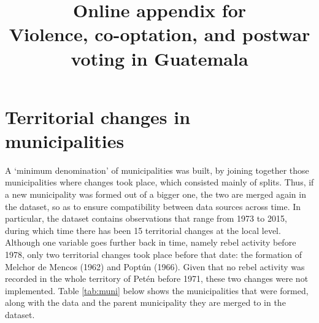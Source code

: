\documentclass[a4paper, 12pt, notitlepage]{article}
\title{\Large Online appendix for\\Violence, co-optation, and postwar voting in Guatemala}
\author{}%
\date{}
\begin{document}
\maketitle

\tableofcontents


\clearpage
\section{Territorial changes in municipalities}\label{app:muni}

A `minimum denomination' of municipalities was built, by joining together those municipalities where changes took place, which consisted mainly of splits.
Thus, if a new municipality was formed out of a bigger one, the two are merged again in the dataset, so as to ensure compatibility between data sources across time.
In particular, the dataset contains observations that range from 1973 to 2015, during which time there has been 15 territorial changes at the local level.
Although one variable goes further back in time, namely rebel activity before 1978, only two territorial changes took place before that date: the formation of Melchor de Mencos (1962) and Poptún (1966).%
Given that no rebel activity was recorded in the whole territory of Petén before 1971, these two changes were not implemented.
Table \ref{tab:muni} below shows the municipalities that were formed, along with the data and the parent municipality they are merged to in the dataset.
\end{document}
